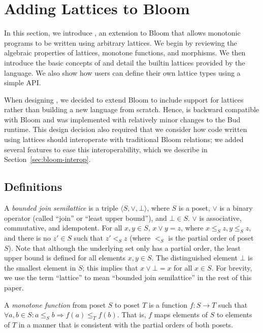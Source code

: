 \section{Adding Lattices to Bloom}
\label{sec:lang}

In this section, we introduce \lang, an extension to Bloom that allows monotonic
programs to be written using arbitrary lattices. We begin by reviewing the
algebraic properties of lattices, monotone functions, and morphisms. We then
introduce the basic concepts of \lang and detail the builtin lattices provided
by the language. We also show how users can define their own lattice types using
a simple API.

When designing \lang, we decided to extend Bloom to include support for lattices
rather than building a new language from scratch. Hence, \lang is backward
compatible with Bloom and was implemented with relatively minor changes to the
Bud runtime. This design decision also required that we consider how code
written using lattices should interoperate with traditional Bloom relations; we
added several \lang features to ease this interoperability, which we describe in
Section~\ref{sec:bloom-interop}.

\subsection{Definitions}
\label{sec:lattice-defn}
A \emph{bounded join semilattice} is a triple $\langle S, \lor, \bot\rangle$,
where $S$ is a poset, $\lor$ is a binary operator (called ``join'' or ``least
upper bound''), and $\bot \in S$. $\lor$ is associative, commutative, and
idempotent. For all $x, y \in S$, $x \lor y = z$, where $x \leq_S z, y \leq_S
z$, and there is no $z' \in S$ such that $z' <_S z$ (where $<_S$ is the partial
order of poset $S$). Note that although the underlying set only has a partial
order, the least upper bound is defined for all elements $x,y \in S$. The
distinguished element $\bot$ is the smallest element in $S$; this implies that
$x \lor \bot = x$ for all $x \in S$. For brevity, we use the term ``lattice'' to
mean ``bounded join semilattice'' in the rest of this paper.

A \emph{monotone function} from poset $S$ to poset $T$ is a function $f: S \to
T$ such that $\forall a,b \in S: a \leq_S b \Rightarrow f(a) \leq_T f(b)$. That
is, $f$ maps elements of $S$ to elements of $T$ in a manner that is consistent
with the partial orders of both posets.


